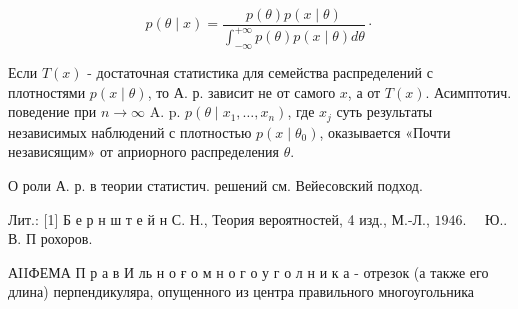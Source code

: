 \documentclass[10pt]{article}
\begin{document}
\[

p(\theta \mid x)=\frac{p(\theta) p(x \mid \theta)}{\int_{-\infty}^{+\infty} p(\theta) p(x \mid \theta) d \theta} \cdot

\]



Если $T(x)$ - достаточная статистика для семейства распределений с плотностями $p(x \mid \theta)$, то А. р. зависит не от самого $x$, а от $T(x)$. Асимптотич. поведение при $n \rightarrow \infty$ A. p. $p\left(\theta \mid x_{1}, \ldots, x_{n}\right)$, где $x_{j}$ суть результаты независимых наблюдений с плотностью $p\left(x \mid \theta_{0}\right)$, оказывается «Почти независящим» от априорного распределения $\theta$.



О роли А. р. в теории статистич. решений см. Вейесовский подход.



Лит.: [1] Б е р н ш т е й н С. Н., Теория вероятностей, 4 изд., М.-Л., $1946 . \quad$ Ю.. В. П рохоров.



АIIФЕМА П р а в И ль н о ғ о м н о г о у г о л н и к а - отрезок (а также его длина) перпендикуляра, опущенного из центра правильного многоугольника
\end{document}
